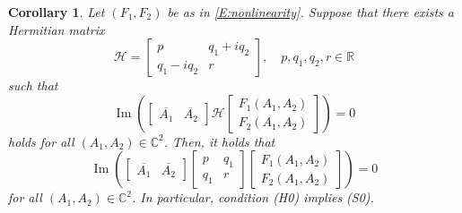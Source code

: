 \documentclass[11pt,a4paper,oneside]{amsart}
\theoremstyle{plain}
\newtheorem{corollary}[theorem]{Corollary}
\theoremstyle{remark}
\numberwithin{equation}{section}
\newcommand{\C}{\mathbb{C}}
\newcommand{\R}{\mathbb{R}}
\renewcommand{\Im}{\operatorname{Im}}
\def\({\left(}
\def\){\right)}
\theoremstyle{definition}
\begin{document}
\begin{corollary}\label{C:H0S0}
Let $(F_1,F_2)$ be as in
\eqref{E:nonlinearity}.
Suppose that there exists
a Hermitian matrix
\[
	\mathscr{H} = \begin{bmatrix}
	p & q_1 + i q_2 \\ q_1 - i q_2 & r
	\end{bmatrix}, \quad p,q_1,q_2,r \in \R
\]
such that
\[
	\Im \(\begin{bmatrix} 
	\overline{A_1} & \overline{A_2} 
	\end{bmatrix}
	\mathscr{H}
	\begin{bmatrix}
	F_1 (A_1,A_2) \\
	F_2 (A_1,A_2)
	\end{bmatrix}
	\)
	=0
\]
holds for all $(A_1,A_2) \in \C^2$.
Then, it holds that
\[
	\Im \(\begin{bmatrix} 
	\overline{A_1} & \overline{A_2} 
	\end{bmatrix}
	\begin{bmatrix}
	p & q_1  \\ q_1  & r
	\end{bmatrix}
	\begin{bmatrix}
	F_1 (A_1,A_2) \\
	F_2 (A_1,A_2)
	\end{bmatrix}
	\)
	=0
\]
for all $(A_1,A_2) \in \C^2$.
In particular, condition (H0) implies
(S0).
\end{corollary}
\end{document}
